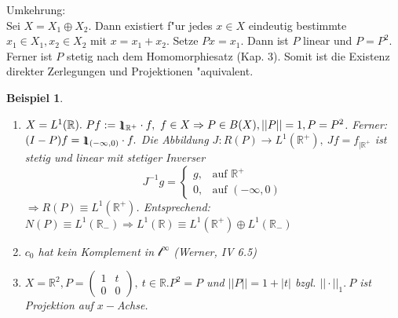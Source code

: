 \documentclass[a4paper,11pt]{book}
\newcommand{\R}{{\mathbb R}}
\newcommand{\ssl}{{\mathcal l}}
\newcommand{\id}{1\hspace{-0,9ex}\raisebox{-0,2ex}{1}}
\newtheorem{Bsp}[Def]{Beispiel}
\theoremstyle{nonumberplain}
\begin{document}
Umkehrung:\\
Sei $X = X_1 \oplus X_2$. Dann existiert f"ur jedes $x \in X$ eindeutig bestimmte $x_1 \in X_1, x_2 \in X_2$ mit $x = x_1 + x_2$. Setze $Px = x_1$. Dann ist $P$ linear und $P=P^2$. Ferner ist $P$ stetig nach dem Homomorphiesatz (Kap. 3). Somit ist die Existenz direkter Zerlegungen und Projektionen "aquivalent.

\begin{Bsp}
\begin{enumerate}

\item[a)] $X = L^1(\R).\ Pf := \id_{\R^+} \cdot f,\ f \in X \Rightarrow P \in B(X), ||P|| = 1, P = P^2$. Ferner: $(I-P)f = \id_{(-\infty,0)} \cdot f.$ Die Abbildung $J: R(P) \rightarrow L^1(\R^+),\ Jf = f_{|\R^+}$ ist stetig und linear mit stetiger Inverser
\[
J^{-1}g = \left\{
\begin{array}{cl}
g ,& \text{auf } \R^+ \\
0 ,& \text{auf } (-\infty,0)
\end{array} \right.
\]
$\Rightarrow R(P) \equiv L^1(\R^+)$. Entsprechend: $N(P) \equiv L^1(\R_-) \Rightarrow L^1(\R) \equiv L^1(\R^+) \oplus L^1(\R_-)$

\item[b)] $c_0$ hat kein Komplement in $\ssl^{\infty}$ (Werner, IV 6.5)

\item[c)] $X = \R^2, P = \begin{pmatrix} 1 & t \\ 0 & 0 \end{pmatrix},\ t \in \R. P^2 = P$ und $||P|| = 1 + |t|$ bzgl. $||\cdot||_1.\ P$ ist Projektion auf $x-$Achse.
\end{enumerate}
\end{Bsp}
\end{document}

